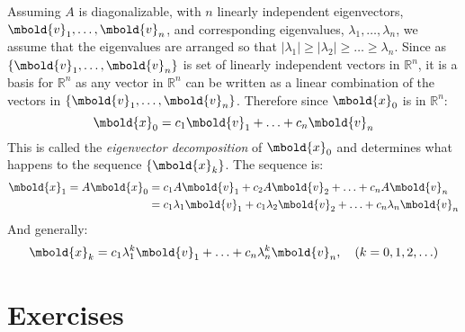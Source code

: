 \documentclass[12pt letter]{report}
\begin{document}
Assuming $A$ is diagonalizable, with $n$ linearly independent eigenvectors, $\mbold{v}_1, \ldots, \mbold{v}_n$, and
corresponding eigenvalues, $\lambda_1, \ldots, \lambda_n$, we assume that the eigenvalues are arranged so that $ \mid
  \lambda _1 \mid \geq  \mid \lambda _2  \mid \geq \ldots \geq \lambda_n$. Since as $\{\mbold{v}_1, \ldots,
  \mbold{v}_n\} $ is set of linearly independent vectors in $\mathbb{R}^{n}$, it is a basis for $\mathbb{R}^{n}$ as any
vector in $\mathbb{R}^{n}$ can be written as a linear combination of the vectors in $\{\mbold{v}_1, \ldots,
  \mbold{v}_n\} $. Therefore since $\mbold{x}_0$ is in $\mathbb{R}^{n}$:
\[
  \mbold{x}_0 = c_1 \mbold{v}_1 + \ldots + c_n \mbold{v}_n
\]
This is called the \textit{eigenvector decomposition} of $\mbold{x}_0$ and determines what happens to the sequence
$\{\mbold{x}_k\} $. The sequence is:
\begin{align*}
  \mbold{x}_1 = A \mbold{x}_0 & = c_1 A\mbold{v}_1 + c_2 A \mbold{v}_2 + \ldots + c_n A \mbold{v}_n                           \\
                              & = c_1 \lambda_1 \mbold{v}_1 + c_1 \lambda_2 \mbold{v}_2 + \ldots + c_n \lambda _n \mbold{v}_n \\
\end{align*}
And generally:
\[
  \mbold{x}_k = c_1 \lambda^{k}_1 \mbold{v}_1 + \ldots + c_n \lambda ^{k}_n \mbold{v}_n, \quad \left( k= 0,1,2, \ldots \right)
\]

\section{Exercises}

\end{document}
